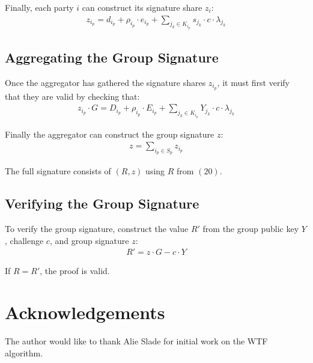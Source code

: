 \documentclass{article}
\begin{document}
Finally, each party $i$ can construct its signature share $z_i$:
\begin{align}
  z_{i_p} = d_{i_p} + \rho_{i_p} \cdot e_{i_p} + \sum_{j_k \in K_{i_p}}^{} s_{j_k} \cdot c \cdot \lambda_{j_k}
\end{align}


\subsection{
  Aggregating the Group Signature
}

Once the aggregator has gathered the signature shares $z_{i_p}$, it must first verify that they are valid by checking that:
\begin{align}
  z_{i_p} \cdot G = D_{i_p} + \rho_{i_p} \cdot E_{i_p} + \sum_{j_k \in K_{i_p}}^{} Y_{j_k} \cdot c \cdot \lambda_{j_k}
\end{align}

Finally the aggregator can construct the group signature $z$:
\begin{align}
  z = \sum_{i_p \in S_p}^{} z_{i_p}
\end{align}

The full signature consists of $(R, z)$ using $R$ from $(20)$.

\subsection{
  Verifying the Group Signature
}

To verify the group signature, construct the value $R'$ from the group public key $Y$, challenge $c$, and group signature $z$:
\begin{align}
  R' = z \cdot G - c \cdot Y
\end{align}

If $R = R'$, the proof is valid.

\newpage
\onecolumn

\section{
  Acknowledgements
}

The author would like to thank Alie Slade for initial work on the WTF algorithm.
\end{document}

